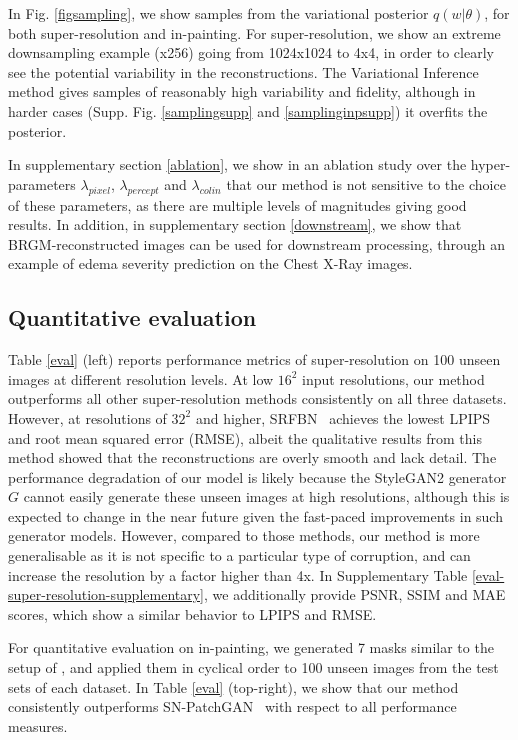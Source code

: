 \documentclass{article}
\newcommand{\srfbn}{SRFBN \cite{li2019feedback}}
\newcommand{\patchgan}{SN-PatchGAN \cite{yu2019free}}
\begin{document}
In Fig. \ref{figsampling}, we show samples from the variational posterior $q(w|\theta)$, for both super-resolution and in-painting. For super-resolution, we show an extreme downsampling example (x256) going from 1024x1024 to 4x4, in order to clearly see the potential variability in the reconstructions. The Variational Inference method gives samples of reasonably high variability and fidelity, although in harder cases (Supp. Fig. \ref{samplingsupp} and \ref{samplinginpsupp}) it overfits the posterior.

In supplementary section \ref{ablation}, we show in an ablation study over the hyper-parameters $\lambda_{pixel}$, $\lambda_{percept}$ and $\lambda_{colin}$ that our method is not sensitive to the choice of these parameters, as there are multiple levels of magnitudes giving good results. In addition, in supplementary section \ref{downstream}, we show that BRGM-reconstructed images can be used for downstream processing, through an example of edema severity prediction on the Chest X-Ray images.


\subsection{Quantitative evaluation}

Table \ref{eval} (left) reports performance metrics of super-resolution on 100 unseen images at different resolution levels. At low $16^2$ input resolutions, our method outperforms all other super-resolution methods consistently on all three datasets. However, at resolutions of $32^2$ and higher, \srfbn\ achieves the lowest LPIPS\cite{zhang2018unreasonable} and root mean squared error (RMSE), albeit the qualitative results from this method showed that the reconstructions are overly smooth and lack detail. The performance degradation of our model is likely because the StyleGAN2 generator $G$ cannot easily generate these unseen images at high resolutions, although this is expected to change in the near future given the fast-paced improvements in such generator models. However, compared to those methods, our method is more generalisable as it is not specific to a particular type of corruption, and can increase the resolution by a factor higher than 4x. In Supplementary Table \ref{eval-super-resolution-supplementary}, we additionally provide PSNR, SSIM and MAE scores, which show a similar behavior to LPIPS and RMSE.

For quantitative evaluation on in-painting, we generated 7 masks similar to the setup of \cite{abdal2020image2stylegan}, and applied them in cyclical order to 100 unseen images from the test sets of each dataset. In Table \ref{eval} (top-right), we show that our method consistently outperforms \patchgan\ with respect to all performance measures. 
\end{document}
